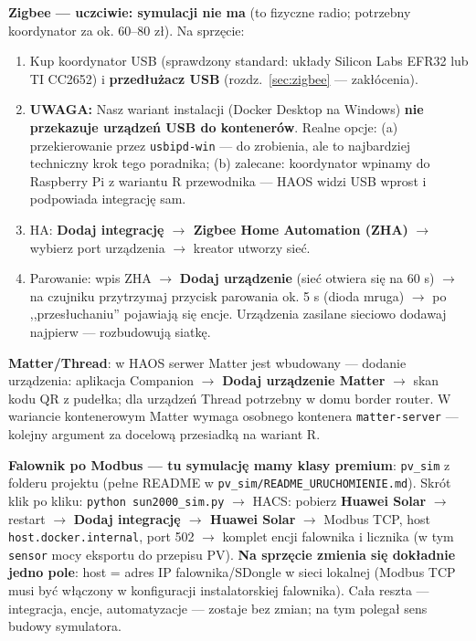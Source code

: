 \documentclass[11pt,a4paper]{article}
\newcommand{\uwaga}[1]{\par\medskip\noindent\textcolor{warnred}{\textbf{UWAGA:}} #1\par\medskip}
\begin{document}
\textbf{Zigbee --- uczciwie: symulacji nie ma} (to fizyczne radio; potrzebny koordynator za ok. 60--80 zł). Na sprzęcie:
\begin{enumerate}
\item Kup koordynator USB (sprawdzony standard: układy Silicon Labs EFR32 lub TI CC2652) i \textbf{przedłużacz USB} (rozdz.~\ref{sec:zigbee} --- zakłócenia).
\item \uwaga{Nasz wariant instalacji (Docker Desktop na Windows) \textbf{nie przekazuje urządzeń USB do kontenerów}. Realne opcje: (a) przekierowanie przez \texttt{usbipd-win} --- do zrobienia, ale to najbardziej techniczny krok tego poradnika; (b) zalecane: koordynator wpinamy do Raspberry Pi z wariantu R przewodnika --- HAOS widzi USB wprost i podpowiada integrację sam.}
\item HA: \textbf{Dodaj integrację $\to$ Zigbee Home Automation (ZHA)} $\to$ wybierz port urządzenia $\to$ kreator utworzy sieć.
\item Parowanie: wpis ZHA $\to$ \textbf{Dodaj urządzenie} (sieć otwiera się na 60 s) $\to$ na czujniku przytrzymaj przycisk parowania ok. 5 s (dioda mruga) $\to$ po ,,przesłuchaniu'' pojawiają się encje. Urządzenia zasilane sieciowo dodawaj najpierw --- rozbudowują siatkę.
\end{enumerate}

\textbf{Matter/Thread}: w HAOS serwer Matter jest wbudowany --- dodanie urządzenia: aplikacja Companion $\to$ \textbf{Dodaj urządzenie Matter} $\to$ skan kodu QR z pudełka; dla urządzeń Thread potrzebny w domu border router. W wariancie kontenerowym Matter wymaga osobnego kontenera \texttt{matter-server} --- kolejny argument za docelową przesiadką na wariant R.

\textbf{Falownik po Modbus --- tu symulację mamy klasy premium}: \texttt{pv\_sim} z folderu projektu (pełne README w \texttt{pv\_sim/README\_URUCHOMIENIE.md}). Skrót klik po kliku: \texttt{python sun2000\_sim.py} $\to$ HACS: pobierz \textbf{Huawei Solar} $\to$ restart $\to$ \textbf{Dodaj integrację $\to$ Huawei Solar} $\to$ Modbus TCP, host \texttt{host.docker.internal}, port 502 $\to$ komplet encji falownika i licznika (w tym \texttt{sensor} mocy eksportu do przepisu PV). \textbf{Na sprzęcie zmienia się dokładnie jedno pole}: host = adres IP falownika/SDongle w sieci lokalnej (Modbus TCP musi być włączony w konfiguracji instalatorskiej falownika). Cała reszta --- integracja, encje, automatyzacje --- zostaje bez zmian; na tym polegał sens budowy symulatora.


\end{document}
